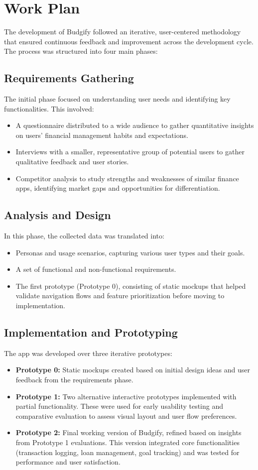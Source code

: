 \documentclass[a4paper,12pt]{article}
\begin{document}
\section{Work Plan}

The development of Budgify followed an iterative, user-centered methodology that ensured continuous feedback and improvement across the development cycle. The process was structured into four main phases:
\subsection{Requirements Gathering}
The initial phase focused on understanding user needs and identifying key functionalities. This involved:
\begin{itemize}
    \item A questionnaire distributed to a wide audience to gather quantitative insights on users' financial management habits and expectations.
    \item Interviews with a smaller, representative group of potential users to gather qualitative feedback and user stories.
    \item Competitor analysis to study strengths and weaknesses of similar finance apps, identifying market gaps and opportunities for differentiation.
\end{itemize}
\subsection{Analysis and Design}
In this phase, the collected data was translated into:
\begin{itemize}
    \item Personas and usage scenarios, capturing various user types and their goals.
    \item A set of functional and non-functional requirements.
    \item The first prototype (Prototype 0), consisting of static mockups that helped validate navigation flows and feature prioritization before moving to implementation.
\end{itemize}
\subsection{Implementation and Prototyping}
The app was developed over three iterative prototypes:
\begin{itemize}
    \item \textbf{Prototype 0:} Static mockups created based on initial design ideas and user feedback from the requirements phase.
    \item \textbf{Prototype 1:} Two alternative interactive prototypes implemented with partial functionality. These were used for early usability testing and comparative evaluation to assess visual layout and user flow preferences.
    \item \textbf{Prototype 2:} Final working version of Budgify, refined based on insights from Prototype 1 evaluations. This version integrated core functionalities (transaction logging, loan management, goal tracking) and was tested for performance and user satisfaction.
\end{itemize}
\end{document}
